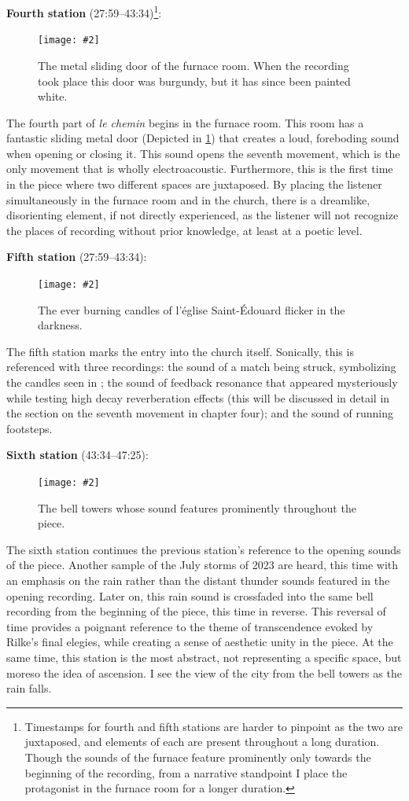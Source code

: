 \documentclass[12pt,twoside,maitrise]{dms_ks}
\newcommand{\customincludegraphics}[4][]{%
    \begin{figure}[H]
        \centering
        \texttt{[image: \#2]}
        \caption{#4}
	\label{#3} 
    \end{figure}
}
\theoremstyle{definition}
\begin{document}
{\textbf{Fourth station} (27:59--43:34)\footnote{Timestamps for fourth and fifth stations are harder to pinpoint as the two are juxtaposed, and elements of each are present throughout a long duration. Though the sounds of the furnace feature prominently only towards the beginning of the recording, from a narrative standpoint I place the protagonist in the furnace room for a longer duration.}:

\customincludegraphics[scale=0.25]{DSC00157.JPG}{fig:station4}{The metal sliding door of the furnace room. When the recording took place this door was burgundy, but it has since been painted white.}%

The fourth part of \textit{le chemin} begins in the furnace room. 
This room has a fantastic sliding metal door (Depicted in \cref{fig:station4}) that creates a loud, foreboding sound when opening or closing it. 
This sound opens the seventh movement, which is the only movement that is wholly electroacoustic. 
Furthermore, this is the first time in the piece where two different spaces are juxtaposed. 
By placing the listener simultaneously in the furnace room and in the church, there is a dreamlike, disorienting element, if not directly experienced, as the listener will not recognize the places of recording without prior knowledge, at least at a poetic level.

\textbf{Fifth station} (27:59--43:34):

\customincludegraphics[scale=0.05]{candles.JPG}{station5}{The ever burning candles of l'église Saint-Édouard flicker in the darkness.}%

The fifth station marks the entry into the church itself. 
Sonically, this is referenced with three recordings: the sound of a match being struck, symbolizing the candles seen in ; the sound of feedback resonance that appeared mysteriously while testing high decay reverberation effects (this will be discussed in detail in the section on the seventh movement in chapter four); and the sound of running footsteps. 

\textbf{Sixth station} (43:34--47:25):

\customincludegraphics[scale=0.07]{eglise_mh.JPG}{station6}{The bell towers whose sound features prominently throughout the piece.}%

The sixth station continues the previous station's reference to the opening sounds of the piece. 
Another sample of the July storms of 2023 are heard, this time with an emphasis on the rain rather than the distant thunder sounds featured in the opening recording. 
Later on, this rain sound is crossfaded into the same bell recording from the beginning of the piece, this time in reverse. 
This reversal of time provides a poignant reference to the theme of transcendence evoked by Rilke's final elegies, while creating a sense of aesthetic unity in the piece.
At the same time, this station is the most abstract, not representing a specific space, but moreso the idea of ascension.
I see the view of the city from the bell towers as the rain falls.

}
\end{document}

